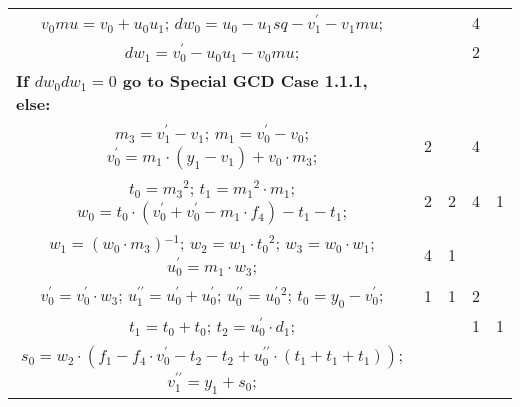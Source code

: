 \begin{tabular}{|c|cr|c|c|c|c|}
\multicolumn{3}{|R{340pt}|}{ 
$v_0mu=v_0+u_0u_1$;\hspace{4pt}
$dw_0=u_0-u_1sq-v^{\prime}_1-v_1mu$;\hspace{4pt}
} &  &  & 4 & \\
\multicolumn{3}{|R{340pt}|}{ 
$dw_1=v^{\prime}_0-u_0u_1-v_0mu$;\hspace{4pt}
} &  &  & 2 & \\
\multicolumn{3}{|l|}{ 
 \bf{If $dw_0dw_1 = 0$ go to Special GCD Case 1.1.1, else:} } &  &  &  & \\
\multicolumn{3}{|R{340pt}|}{ 
$m_3=v^{\prime}_1-v_1$;\hspace{4pt}
$m_1=v^{\prime}_0-v_0$;\hspace{4pt}
$v^{\prime}_0=m_1 \cdot (y_1-v_1)+v_0 \cdot m_3$;\hspace{4pt}
} & 2 &  & 4 & \\
\multicolumn{3}{|R{340pt}|}{ 
$t_0=m_3{}^{2}$;\hspace{4pt}
$t_1=m_1{}^{2} \cdot m_1$;\hspace{4pt}
$w_0=t_0 \cdot (v^{\prime}_0+v^{\prime}_0-m_1 \cdot f_4)-t_1-t_1$;\hspace{4pt}
} & 2 & 2 & 4 & 1\\
\multicolumn{3}{|R{340pt}|}{ 
$w_1=(w_0 \cdot m_3){}^{-1}$;\hspace{4pt}
$w_2=w_1 \cdot t_0{}^{2}$;\hspace{4pt}
$w_3=w_0 \cdot w_1$;\hspace{4pt}
$u^{\prime}_0=m_1 \cdot w_3$;\hspace{4pt}
} & 4 & 1 &  & \\
\multicolumn{3}{|R{340pt}|}{ 
$v^{\prime}_0=v^{\prime}_0 \cdot w_3$;\hspace{4pt}
$u^{\prime\prime}_1=u^{\prime}_0+u^{\prime}_0$;\hspace{4pt}
$u^{\prime\prime}_0=u^{\prime}_0{}^{2}$;\hspace{4pt}
$t_0=y_0-v^{\prime}_0$;\hspace{4pt}
} & 1 & 1 & 2 & \\
\multicolumn{3}{|R{340pt}|}{ 
$t_1=t_0+t_0$;\hspace{4pt}
$t_2=u^{\prime}_0 \cdot d_1$;\hspace{4pt}
} &  &  & 1 & 1\\
\multicolumn{3}{|R{340pt}|}{ 
$s_0=w_2 \cdot (f_1-f_4 \cdot v^{\prime}_0-t_2-t_2+u^{\prime\prime}_0 \cdot (t_1+t_1+t_1))$;\hspace{4pt}
$v^{\prime\prime}_1=y_1+s_0$;\hspace{4pt}
}
\end{tabular}
